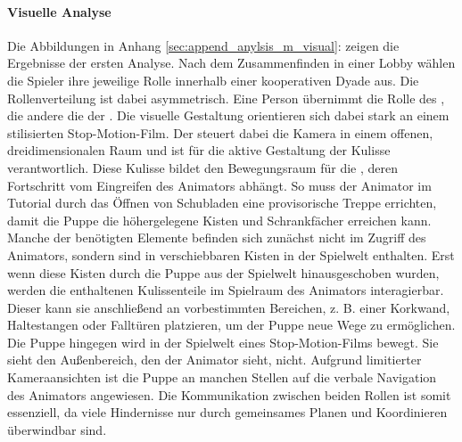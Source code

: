\paragraph{Visuelle Analyse}
Die Abbildungen in Anhang \ref{sec:append_anylsis_m_visual}:  zeigen die Ergebnisse der ersten Analyse. Nach dem Zusammenfinden in einer Lobby wählen die Spieler ihre jeweilige Rolle innerhalb einer kooperativen Dyade aus. Die Rollenverteilung ist dabei asymmetrisch. Eine Person übernimmt die Rolle des , die andere die der . Die visuelle Gestaltung orientieren sich dabei stark an einem stilisierten Stop-Motion-Film. 
Der  steuert dabei die Kamera in einem offenen, dreidimensionalen Raum und ist für die aktive Gestaltung der Kulisse verantwortlich. Diese Kulisse bildet den Bewegungsraum für die , deren Fortschritt vom Eingreifen des Animators abhängt. So muss der Animator im Tutorial durch das Öffnen von Schubladen eine provisorische Treppe errichten, damit die Puppe die höhergelegene Kisten und Schrankfächer erreichen kann. 
Manche der benötigten Elemente befinden sich zunächst nicht im Zugriff des Animators, sondern sind in verschiebbaren Kisten in der Spielwelt enthalten. Erst wenn diese Kisten durch die Puppe aus der Spielwelt hinausgeschoben wurden,  werden die enthaltenen Kulissenteile im Spielraum des Animators interagierbar. Dieser kann sie anschließend an vorbestimmten Bereichen, z. B. einer Korkwand, Haltestangen oder Falltüren platzieren, um der Puppe neue Wege zu ermöglichen.
Die Puppe hingegen wird in der Spielwelt eines Stop-Motion-Films bewegt. Sie sieht den Außenbereich, den der Animator sieht, nicht. Aufgrund limitierter Kameraansichten ist die Puppe an manchen Stellen auf die verbale Navigation des Animators angewiesen. Die Kommunikation zwischen beiden Rollen ist somit essenziell, da viele Hindernisse nur durch gemeinsames Planen und Koordinieren überwindbar sind.

